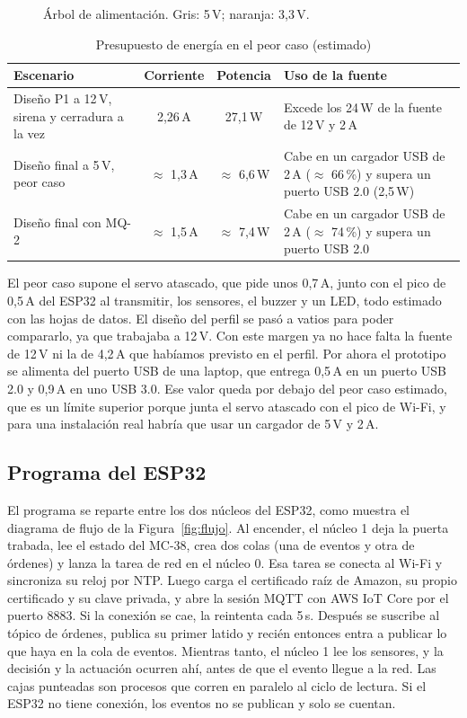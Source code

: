 \documentclass[manuscript,screen,nonacm]{acmart}
\begin{document}
\begin{figure}[htbp]
\centering
{}
\caption{Árbol de alimentación. Gris: 5\,V; naranja: 3,3\,V.}
\label{fig:alimentacion}
\end{figure}

\begin{table}[htbp]
\centering
\caption{Presupuesto de energía en el peor caso (estimado)}
\label{tab:corriente}
\footnotesize
\renewcommand{\arraystretch}{1.15}
\begin{tabular}{@{}L{4.6cm}ccL{3.8cm}@{}}
\toprule
\textbf{Escenario} & \textbf{Corriente} & \textbf{Potencia} & \textbf{Uso de la fuente} \\
\midrule
Diseño P1 a 12\,V, sirena y cerradura a la vez & 2,26\,A & 27,1\,W & Excede los 24\,W de la fuente de 12\,V y 2\,A \\
Diseño final a 5\,V, peor caso & $\approx$ 1,3\,A & $\approx$ 6,6\,W & Cabe en un cargador USB de 2\,A ($\approx$ 66\,\%) y supera un puerto USB 2.0 (2,5\,W) \\
Diseño final con MQ-2 & $\approx$ 1,5\,A & $\approx$ 7,4\,W & Cabe en un cargador USB de 2\,A ($\approx$ 74\,\%) y supera un puerto USB 2.0 \\
\bottomrule
\end{tabular}
\end{table}

El peor caso supone el servo atascado, que pide unos 0,7\,A, junto con el pico de 0,5\,A del ESP32 al transmitir, los sensores, el buzzer y un LED, todo estimado con las hojas de datos. El diseño del perfil se pasó a vatios para poder compararlo, ya que trabajaba a 12\,V. Con este margen ya no hace falta la fuente de 12\,V ni la de 4,2\,A que habíamos previsto en el perfil. Por ahora el prototipo se alimenta del puerto USB de una laptop, que entrega 0,5\,A en un puerto USB 2.0 y 0,9\,A en uno USB 3.0. Ese valor queda por debajo del peor caso estimado, que es un límite superior porque junta el servo atascado con el pico de Wi-Fi, y para una instalación real habría que usar un cargador de 5\,V y 2\,A.

\subsection{Programa del ESP32}
El programa se reparte entre los dos núcleos del ESP32, como muestra el diagrama de flujo de la Figura~\ref{fig:flujo}. Al encender, el núcleo 1 deja la puerta trabada, lee el estado del MC-38, crea dos colas (una de eventos y otra de órdenes) y lanza la tarea de red en el núcleo 0. Esa tarea se conecta al Wi-Fi y sincroniza su reloj por NTP. Luego carga el certificado raíz de Amazon, su propio certificado y su clave privada, y abre la sesión MQTT con AWS IoT Core por el puerto 8883. Si la conexión se cae, la reintenta cada 5\,s. Después se suscribe al tópico de órdenes, publica su primer latido y recién entonces entra a publicar lo que haya en la cola de eventos. Mientras tanto, el núcleo 1 lee los sensores, y la decisión y la actuación ocurren ahí, antes de que el evento llegue a la red. Las cajas punteadas son procesos que corren en paralelo al ciclo de lectura. Si el ESP32 no tiene conexión, los eventos no se publican y solo se cuentan.
\end{document}

